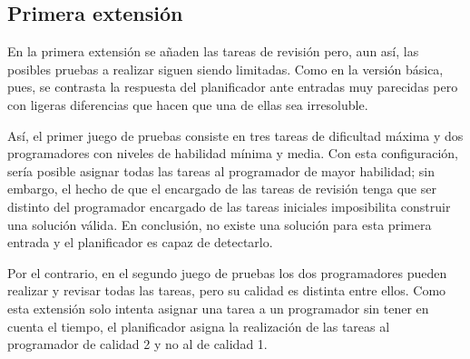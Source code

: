 
\subsection{Primera extensión} \label{sec:res-ext1}

En la primera extensión se añaden las tareas de revisión pero, aun así, las 
posibles pruebas a realizar siguen siendo limitadas. Como en la versión 
básica, pues, se contrasta la respuesta del planificador ante entradas muy 
parecidas pero con ligeras diferencias que hacen que una de ellas sea 
irresoluble.

Así, el primer juego de pruebas consiste en tres tareas de dificultad máxima 
y dos programadores con niveles de habilidad mínima y media. Con esta 
configuración, sería posible asignar todas las tareas al programador de mayor 
habilidad; sin embargo, el hecho de que el encargado de las tareas de revisión 
tenga que ser distinto del programador encargado de las tareas iniciales 
imposibilita construir una solución válida. En conclusión, no existe una 
solución para esta primera entrada y el planificador es capaz de detectarlo.

Por el contrario, en el segundo juego de pruebas los dos programadores pueden
realizar y revisar todas las tareas, pero su calidad es distinta entre ellos.
Como esta extensión solo intenta asignar una tarea a un programador sin tener
en cuenta el tiempo, el planificador asigna la realización de las tareas al
programador de calidad 2 y no al de calidad 1.




